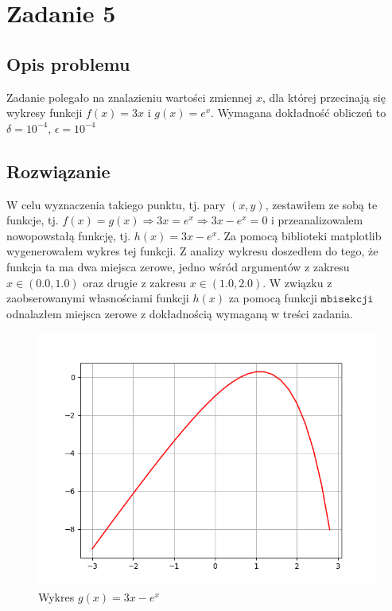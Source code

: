 \section{Zadanie 5}
\subsection{Opis problemu}
Zadanie polegało na znalazieniu wartości zmiennej $ x $, dla której przecinają się wykresy funkcji $ f(x) = 3x $ i $ g(x) = e^{x}$. Wymagana dokładność obliczeń to $ \delta = 10^{-4}$, $\epsilon = 10^{-4}$
\subsection{Rozwiązanie}
W celu wyznaczenia takiego punktu, tj. pary $(x, y)$, zestawiłem ze sobą te funkcje, tj. $ f(x) = g(x) \Rightarrow 3x = e^{x} \Rightarrow 3x - e^{x} = 0$ i przeanalizowalem nowopowstałą funkcję, tj. $ h(x) = 3x - e^{x}$. Za pomocą biblioteki matplotlib wygenerowałem wykres tej funkcji. Z analizy wykresu doszedłem do tego, że funkcja ta ma dwa miejsca zerowe, jedno wśród argumentów z zakresu $ x \in  (0.0, 1.0) $ oraz drugie z zakresu $ x \in (1.0, 2.0) $. W związku z zaobserowanymi własnościami funkcji $ h(x) $ za pomocą funkcji $ \texttt{mbisekcji} $ odnalazłem miejsca zerowe z dokładnością wymaganą w treści zadania.

\begin{figure}[!htbp]
  \centering  
  \includegraphics[totalheight=6cm]{../plots/ex5.png}
  \caption{Wykres $g(x) = 3x - e^{x}$}
\end{figure}

